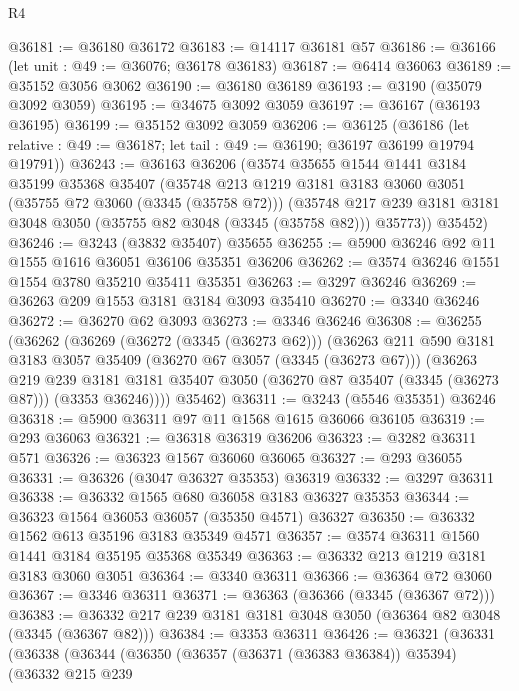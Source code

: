 \begin{lexlean}{R4}
\begin{coremodule}
@36181 := @36180 @36172
@36183 := @14117 @36181 @57
@36186 := @36166 (let unit : @49 := @36076; @36178 @36183)
@36187 := @6414 @36063
@36189 := @35152 @3056 @3062
@36190 := @36180 @36189
@36193 := @3190 (@35079 @3092 @3059)
@36195 := @34675 @3092 @3059
@36197 := @36167 (@36193 @36195)
@36199 := @35152 @3092 @3059
@36206 := @36125
    (@36186 (let relative : @49 := @36187; let tail : @49 := @36190; @36197 @36199 @19794 @19791))
@36243 := @36163
    @36206
    (@3574
      @35655
      @1544
      @1441
      @3184
      @35199
      @35368
      @35407
      (@35748
        @213
        @1219
        @3181
        @3183
        @3060
        @3051
        (@35755 @72 @3060 (@3345 (@35758 @72)))
        (@35748 @217 @239 @3181 @3181 @3048 @3050 (@35755 @82 @3048 (@3345 (@35758 @82))) @35773))
      @35452)
@36246 := @3243 (@3832 @35407) @35655
@36255 := @5900 @36246 @92 @11 @1555 @1616 @36051 @36106 @35351 @36206
@36262 := @3574 @36246 @1551 @1554 @3780 @35210 @35411 @35351
@36263 := @3297 @36246
@36269 := @36263 @209 @1553 @3181 @3184 @3093 @35410
@36270 := @3340 @36246
@36272 := @36270 @62 @3093
@36273 := @3346 @36246
@36308 := @36255
    (@36262
      (@36269
        (@36272 (@3345 (@36273 @62)))
        (@36263
          @211
          @590
          @3181
          @3183
          @3057
          @35409
          (@36270 @67 @3057 (@3345 (@36273 @67)))
          (@36263
            @219
            @239
            @3181
            @3181
            @35407
            @3050
            (@36270 @87 @35407 (@3345 (@36273 @87)))
            (@3353 @36246))))
      @35462)
@36311 := @3243 (@5546 @35351) @36246
@36318 := @5900 @36311 @97 @11 @1568 @1615 @36066 @36105
@36319 := @293 @36063
@36321 := @36318 @36319 @36206
@36323 := @3282 @36311 @571
@36326 := @36323 @1567 @36060 @36065
@36327 := @293 @36055
@36331 := @36326 (@3047 @36327 @35353) @36319
@36332 := @3297 @36311
@36338 := @36332 @1565 @680 @36058 @3183 @36327 @35353
@36344 := @36323 @1564 @36053 @36057 (@35350 @4571) @36327
@36350 := @36332 @1562 @613 @35196 @3183 @35349 @4571
@36357 := @3574 @36311 @1560 @1441 @3184 @35195 @35368 @35349
@36363 := @36332 @213 @1219 @3181 @3183 @3060 @3051
@36364 := @3340 @36311
@36366 := @36364 @72 @3060
@36367 := @3346 @36311
@36371 := @36363 (@36366 (@3345 (@36367 @72)))
@36383 := @36332 @217 @239 @3181 @3181 @3048 @3050 (@36364 @82 @3048 (@3345 (@36367 @82)))
@36384 := @3353 @36311
@36426 := @36321
    (@36331
      (@36338
        (@36344
          (@36350
            (@36357 (@36371 (@36383 @36384)) @35394)
            (@36332
              @215
              @239

\end{coremodule}
\end{lexlean}
